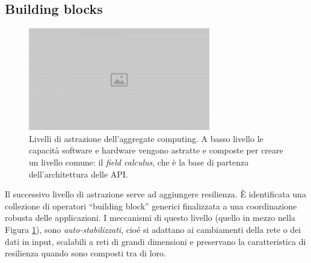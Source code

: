 \subsection{Building blocks}
\begin{figure}
  \centering
  \includegraphics[width=\linewidth]{images/placeholder.jpg}
  \caption{Livelli di astrazione dell'aggregate computing. A basso livello le
    capacità software e hardware vengono astratte e composte per creare un
    livello comune: il \textit{field calculus}, che è la base di
    partenza dell'architettura delle API.}
  \label{fig:abstraction-layers}
\end{figure}


Il successivo livello di astrazione serve ad aggiungere resilienza. È
identificata una collezione di operatori ``building block'' generici finalizzata
a una coordinazione robusta delle applicazioni. I meccanismi di questo livello
(quello in mezzo nella Figura \ref{fig:abstraction-layers}), sono
\textit{auto-stabilizzati}, cioé si adattano ai cambiamenti della rete o dei
dati in input, scalabili a reti di grandi dimensioni e preservano la
caratteristica di resilienza quando sono composti tra di loro\cite{7056345}.

